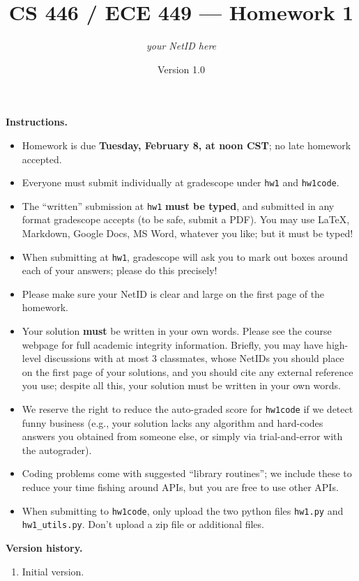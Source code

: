 \documentclass{article}
\title{CS 446 / ECE 449 --- Homework 1}
\author{\emph{your NetID here}}
\date{Version 1.0}
\theoremstyle{definition}
\theoremstyle{remark}
\begin{document}
  \maketitle

  \noindent\textbf{Instructions.}
  \begin{itemize}
    \item
      Homework is due \textbf{Tuesday, February 8, at noon CST}; no late homework accepted.

    \item
      Everyone must submit individually at gradescope under \texttt{hw1} and \texttt{hw1code}.

    \item
      The ``written'' submission at \texttt{hw1} \textbf{must be typed}, and submitted in
      any format gradescope accepts (to be safe, submit a PDF).  You may use \LaTeX, Markdown,
      Google Docs, MS Word, whatever you like; but it must be typed!

    \item
      When submitting at \texttt{hw1}, gradescope will ask you to mark out boxes
      around each of your answers; please do this precisely!

    \item
      Please make sure your NetID is clear and large on the first page of the homework.

    \item
      Your solution \textbf{must} be written in your own words.
      Please see the course webpage for full academic integrity information.
      Briefly, you may have high-level discussions with at most 3 classmates,
      whose NetIDs you should place on the first page of your solutions,
      and you should cite any external reference you use; despite all this,
      your solution must be written in your own words.

    \item
      We reserve the right to reduce the auto-graded score for
      \texttt{hw1code} if we detect funny business (e.g., your solution
      lacks any algorithm and hard-codes answers you obtained from
      someone else, or simply via trial-and-error with the autograder).

    \item
      Coding problems come with suggested ``library routines''; we include these to reduce
      your time fishing around APIs, but you are free to use other APIs.

    \item
      When submitting to \texttt{hw1code}, only upload the two python files \texttt{hw1.py} and \texttt{hw1\_utils.py}. Don't upload a zip file or additional files.

  \end{itemize}
  \noindent\textbf{Version history.}
  \begin{enumerate}
    \item Initial version.
  \end{enumerate}
\end{document}
